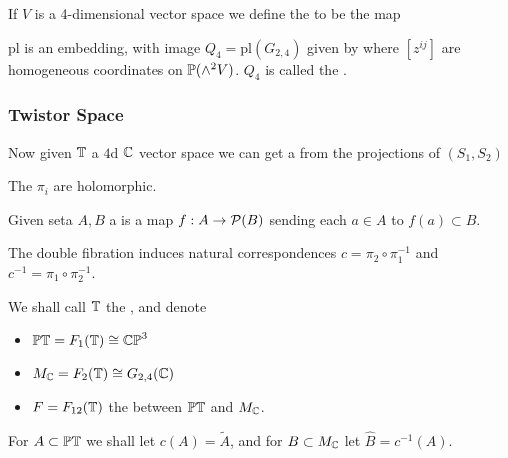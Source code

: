 \documentclass{article}
\begin{document}
\begin{definition}
	If $V$ is a 4-dimensional vector space we define the  to be the map 
\end{definition}

\begin{theorem}
	$\text{pl}$ is an embedding, with image $Q_4 = \text{pl}(G_{2,4})$ given by 
where $[z^{ij}]$ are homogeneous coordinates on $\mathbb{P}(\wedge^2 V)$. $Q_4$ is called the . 
\end{theorem}

\subsubsection{Twistor Space}
Now given $\mathbb{T}$ a $4$d $\mathbb{C}$ vector space we can get a 
from the projections of $(S_1,S_2)$ 
\begin{prop}
	The $\pi_i$ are holomorphic.
\end{prop}

\begin{definition}
	Given seta $A,B$ a   is a map $f: A \to \mathcal{P}(B)$ sending each $a \in A$ to $f(a) \subset B$.
\end{definition}
The double fibration induces natural correspondences $c=\pi_2 \circ \pi_1^{-1}$ and $c^{-1} = \pi_1 \circ \pi_2^{-1}$. 
\begin{notation}
	We shall call $\mathbb{T}$ the , and denote 
	\begin{itemize}
		\item $\mathbb{PT}=F_1(\mathbb{T}) \cong \mathbb{CP}^3$ 
		\item $M_{\mathbb{C}} = F_2(\mathbb{T}) \cong G_{2,4}(\mathbb{C})$ 
		\item $F = F_{12}(\mathbb{T})$ the  between $\mathbb{PT}$ and $M_{\mathbb{C}}$. 
	\end{itemize}
For $A \subset \mathbb{PT}$ we shall let $c(A) = \tilde{A}$, and for $B \subset M_{\mathbb{C}}$ let $\hat{B} = c^{-1}(A)$. 
\end{notation}
\end{document}
